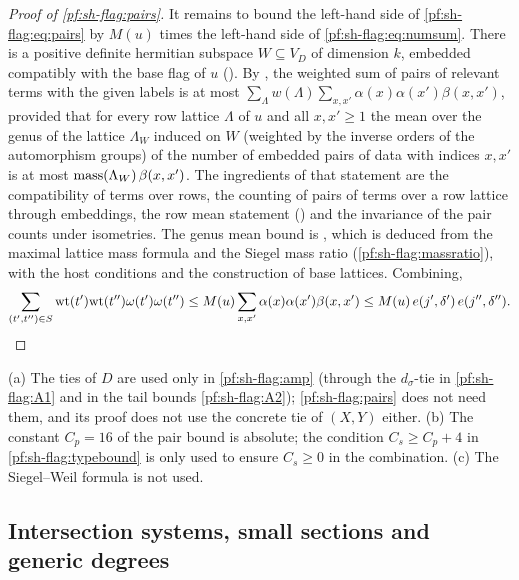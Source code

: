 \begin{proof}[Proof of \cref{pf:sh-flag:pairs}]
It remains to bound the left-hand side of \eqref{pf:sh-flag:eq:pairs} by $M(u)$ times the left-hand side of \eqref{pf:sh-flag:eq:numsum}.
There is a positive definite hermitian subspace $W\subseteq V_D$ of dimension $k$, embedded compatibly with the base flag of $u$
(). By ,
the weighted sum of pairs of relevant terms with the given labels is at most $\sum_\Lambda w(\Lambda)\sum_{x,x'}\alpha(x)\alpha(x')\beta(x,x')$,
provided that for every row lattice $\Lambda$ of $u$ and all $x,x'\ge1$ the mean over the genus of the lattice $\Lambda_W$ induced on $W$
(weighted by the inverse orders of the automorphism groups) of the number of embedded pairs of data with indices $x,x'$ is at most
$\operatorname{mass}(\Lambda_W)\,\beta(x,x')$. The ingredients of that statement are the compatibility of terms over rows, the counting of
pairs of terms over a row lattice through embeddings, the row mean statement () and the
invariance of the pair counts under isometries. The genus mean bound is
, which is deduced from the maximal lattice mass formula and
the Siegel mass ratio (\cref{pf:sh-flag:massratio}), with the host conditions and the construction of base lattices. Combining,
\[
\sum_{(t',t'')\in S}\mathrm{wt}(t')\mathrm{wt}(t'')\omega(t')\omega(t'')\le M(u)\sum_{x,x'}\alpha(x)\alpha(x')\beta(x,x')\le
M(u)\,e(j',\delta')\,e(j'',\delta'').\qedhere
\]
\end{proof}

\begin{remark}\label{pf:sh-flag:rem:type}
(a) The ties of $D$ are used only in \cref{pf:sh-flag:amp} (through the $d_\sigma$-tie in \ref{pf:sh-flag:A1} and in the tail
bounds \ref{pf:sh-flag:A2}); \cref{pf:sh-flag:pairs} does not need them, and its proof does not use the concrete tie of $(X,Y)$
either. (b) The constant $C_p=16$ of the pair bound is absolute; the condition $C_s\ge C_p+4$ in
\cref{pf:sh-flag:typebound} is only used to ensure $C_s\ge0$ in the combination. (c) The Siegel--Weil formula is not used.
\end{remark}

\subsection{Intersection systems, small sections and generic degrees}\label{sec:pf:sh-flag:geo}


